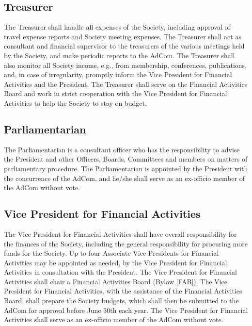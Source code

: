 \documentclass[10pt]{article}
\newcommand{\blref}[1]{Bylaw \ref{#1}}
\begin{document}
\subsection{Treasurer}

The Treasurer shall handle all expenses of the Society, including approval of travel expense reports and Society meeting expenses. The Treasurer shall act as consultant and financial supervisor to the treasurers of the various meetings held by the Society, and make periodic reports to the AdCom. The Treasurer shall also monitor all Society income, e.g., from membership, conferences, publications, and, in case of irregularity, promptly inform the Vice President for Financial Activities and the President. The Treasurer shall serve on the Financial Activities Board and work in strict cooperation with the Vice President for Financial Activities to help the Society to stay on budget.  


\subsection{Parliamentarian}

The Parliamentarian is a consultant officer who has the responsibility to advise the President and other Officers, Boards, Committees and members on matters of parliamentary procedure. The Parliamentarian is appointed by the President with the concurrence of the AdCom, and he/she shall serve as an ex-officio member of the AdCom without vote.


\subsection{Vice President for Financial Activities}

The Vice President for Financial Activities shall have overall responsibility for the finances of the Society, including the general responsibility for procuring more funds for the Society. Up to four Associate Vice Presidents for Financial Activities may be appointed as needed, by the Vice President for Financial Activities in consultation with the President. The Vice President for Financial Activities shall chair a Financial Activities Board (\blref{FAB}). The Vice President for Financial Activities, with the assistance of the Financial Activities Board, shall prepare the Society budgets, which shall then be submitted to the AdCom for approval before June 30th each year. The Vice President for Financial Activities shall serve as an ex-officio member of the AdCom without vote.
\end{document}
